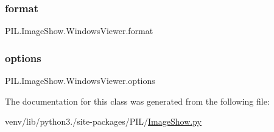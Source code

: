 \subsubsection{\texorpdfstring{format}{format}}
{\footnotesize\ttfamily P\+I\+L.\+Image\+Show.\+Windows\+Viewer.\+format\hspace{0.3cm}{\ttfamily [static]}}

\mbox{\label{classPIL_1_1ImageShow_1_1WindowsViewer_affe3b08113fb968b6effd1272b5c8bd9}} 
\subsubsection{\texorpdfstring{options}{options}}
{\footnotesize\ttfamily P\+I\+L.\+Image\+Show.\+Windows\+Viewer.\+options\hspace{0.3cm}{\ttfamily [static]}}



The documentation for this class was generated from the following file\+:\begin{DoxyCompactItemize}
\item 
venv/lib/python3./site-\/packages/\+P\+I\+L/\hyperlink{ImageShow_8py}{Image\+Show.\+py}\end{DoxyCompactItemize}
